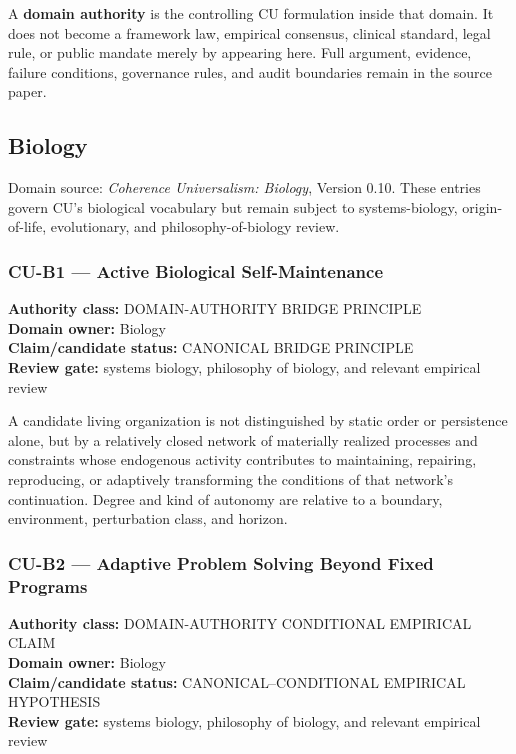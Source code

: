 \documentclass[
  11pt,
]{article}
\begin{document}
A \textbf{domain authority} is the controlling CU formulation inside
that domain. It does not become a framework law, empirical consensus,
clinical standard, legal rule, or public mandate merely by appearing
here. Full argument, evidence, failure conditions, governance rules, and
audit boundaries remain in the source paper.

\subsection{Biology}\label{biology}

Domain source: \emph{Coherence Universalism: Biology}, Version 0.10.
These entries govern CU's biological vocabulary but remain subject to
systems-biology, origin-of-life, evolutionary, and philosophy-of-biology
review.

\subsubsection{CU-B1 --- Active Biological
Self-Maintenance}\label{cu-b1-active-biological-self-maintenance}

\textbf{Authority class:} DOMAIN-AUTHORITY BRIDGE PRINCIPLE\\
\textbf{Domain owner:} Biology\\
\textbf{Claim/candidate status:} CANONICAL BRIDGE PRINCIPLE\\
\textbf{Review gate:} systems biology, philosophy of biology, and
relevant empirical review

A candidate living organization is not distinguished by static order or
persistence alone, but by a relatively closed network of materially
realized processes and constraints whose endogenous activity contributes
to maintaining, repairing, reproducing, or adaptively transforming the
conditions of that network's continuation. Degree and kind of autonomy
are relative to a boundary, environment, perturbation class, and
horizon.

\subsubsection{CU-B2 --- Adaptive Problem Solving Beyond Fixed
Programs}\label{cu-b2-adaptive-problem-solving-beyond-fixed-programs}

\textbf{Authority class:} DOMAIN-AUTHORITY CONDITIONAL EMPIRICAL CLAIM\\
\textbf{Domain owner:} Biology\\
\textbf{Claim/candidate status:} CANONICAL--CONDITIONAL EMPIRICAL
HYPOTHESIS\\
\textbf{Review gate:} systems biology, philosophy of biology, and
relevant empirical review
\end{document}

